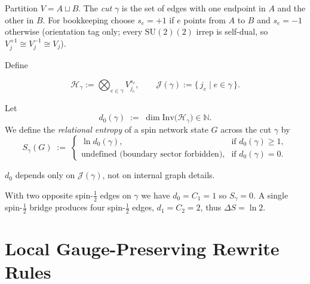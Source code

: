 \documentclass[11pt]{article}
\newcommand{\SU}{\mathrm{SU}(2)}
\newcommand{\Hil}{\mathcal{H}}
\newcommand{\Inv}{\mathrm{Inv}}
\newcommand{\Cut}{\gamma}
\newcommand{\JS}{\mathcal{J}} %
\begin{document}
\begin{definition}\label{def:cut} Partition $V=A\sqcup B$. The \emph{cut} $\Cut$ is the set of edges with one endpoint in $A$ and the other in $B$. For bookkeeping choose $s_e=+1$ if $e$ points from $A$ to $B$ and $s_e=-1$ otherwise (orientation tag only; every $\SU(2)$ irrep is self-dual, so $V_j^{+1}\!\cong V_j^{-1}\!\cong V_j$).

  Define

  \[\Hil_{\Cut}:=\bigotimes_{e\in\Cut} V_{j_e}^{s_e},\qquad \JS(\Cut):=\{\,j_e\mid e\in\Cut\,\}.\]

\end{definition}

\begin{definition}\label{def:entropy}
  Let
  \[
    d_0(\Cut)\;:=\;
    \dim\Inv\!\bigl(\Hil_{\Cut}\bigr)
    \in\mathbb{N}.
  \]
  We define the \emph{relational entropy} of a spin network state
  \(G\) across the cut \(\Cut\) by
  \[
    S_{\Cut}(G)\;:=\;
    \begin{cases}
      \ln d_0(\Cut), & \text{if } d_0(\Cut)\ge 1, \\[6pt]
      \text{undefined (boundary sector forbidden),} & \text{if } d_0(\Cut)=0.
    \end{cases}
  \]
\end{definition}

\begin{remark} $d_0$ depends only on $\JS(\Cut)$, not on internal graph details.
\end{remark}

\begin{example}\label{ex:toy} With two opposite spin-$\tfrac12$ edges on $\Cut$ we have $d_0=C_1=1$ so $S_{\Cut}=0$. A single spin-$\tfrac12$ bridge produces four spin-$\tfrac12$ edges, $d_1=C_2=2$, thus $\Delta S=\ln2$.
\end{example}


\section{Local Gauge-Preserving Rewrite Rules}\label{sec:rewrites}
\end{document}
